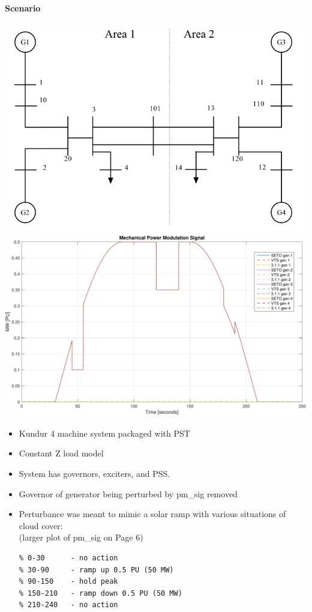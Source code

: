 \documentclass[12pt]{article}
\begin{document}
\onehalfspacing
\paragraph{Scenario} \begin{center}
\begin{minipage}{.47\linewidth}
\centering
\includegraphics[width=\linewidth]{../200806-ExtendedVersionComp/sysOneLineAreas}
\includegraphics[width=.8\linewidth]{../200806-ExtendedVersionComp/verPmSig}
\end{minipage} %
\begin{minipage}{.47\linewidth}
\begin{itemize}
\footnotesize
\itemsep 0em
\item Kundur  4 machine system packaged with PST
\item Constant Z load model
\item System has governors, exciters, and PSS.
\item Governor of generator being perturbed by pm\_sig removed
\item Perturbance was meant to mimic a solar ramp with various situations of cloud cover:\\
(larger plot of pm\_sig on Page 6)
\begin{Verbatim}[fontsize=\scriptsize]
% time [seconds]
% 0-30      - no action
% 30-90     - ramp up 0.5 PU (50 MW)
% 90-150    - hold peak
% 150-210   - ramp down 0.5 PU (50 MW)
% 210-240   - no action


\end{Verbatim}
\end{itemize}
\end{minipage}
\end{center}
\end{document}
